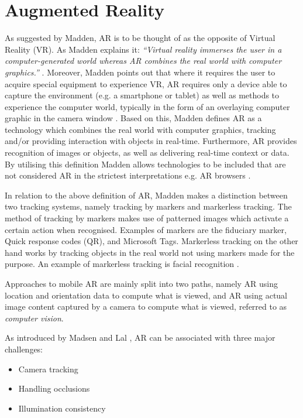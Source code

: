 \section{Augmented Reality}\label{sec:background_ar}
As suggested by Madden, AR is to be thought of as the opposite of Virtual Reality (VR). As Madden explains it: \textit{“Virtual reality immerses the user in a computer-generated world whereas AR combines the real world with computer graphics.”} \cite{Madden2011}. Moreover, Madden points out that where it requires the user to acquire special equipment to experience VR, AR requires only a device able to capture the environment (e.g. a smartphone or tablet) as well as methods to experience the computer world, typically in the form of an overlaying computer graphic in the camera window \cite{Madden2011}. Based on this, Madden defines AR as a technology which combines the real world with computer graphics, tracking and/or providing interaction with objects in real-time. Furthermore, AR provides recognition of images or objects, as well as delivering real-time context or data. By utilising this definition Madden allows technologies to be included that are not considered AR in the strictest interpretations e.g. AR browsers \cite{Madden2011}.

In relation to the above definition of AR, Madden makes a distinction between two tracking systems, namely tracking by markers and markerless tracking. The method of tracking by markers makes use of patterned images which activate a certain action when recognised. Examples of markers are the fiduciary marker, Quick response codes (QR), and Microsoft Tags. Markerless tracking on the other hand works by tracking objects in the real world not using markers made for the purpose. An example of markerless tracking is facial recognition \cite{Madden2011}.

Approaches to mobile AR are mainly split into two paths, namely AR using location and orientation data to compute what is viewed, and AR using actual image content captured by a camera to compute what is viewed, referred to as \textit{computer vision}.

As introduced by Madsen and Lal \cite{Lal2010}, AR can be associated with three major challenges:

\begin{itemize}
\item Camera tracking 
\item Handling occlusions
\item Illumination consistency
\end{itemize}

